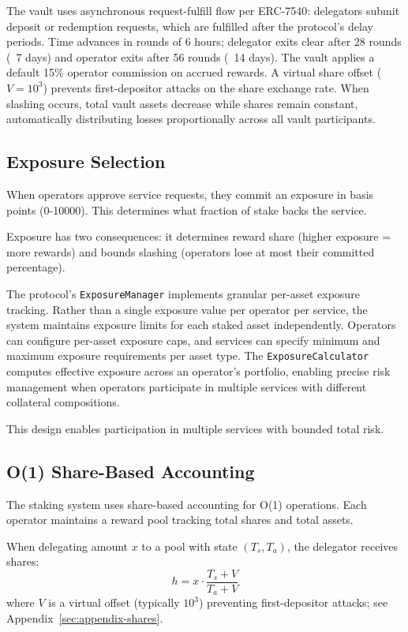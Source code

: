 \documentclass[11pt,a4paper]{article}
\begin{document}
The vault uses asynchronous request-fulfill flow per ERC-7540: delegators submit deposit or redemption requests, which are fulfilled after the protocol's delay periods. Time advances in rounds of 6 hours; delegator exits clear after 28 rounds (~7 days) and operator exits after 56 rounds (~14 days). The vault applies a default 15\% operator commission on accrued rewards. A virtual share offset ($V = 10^3$) prevents first-depositor attacks on the share exchange rate. When slashing occurs, total vault assets decrease while shares remain constant, automatically distributing losses proportionally across all vault participants.

\subsection{Exposure Selection}

When operators approve service requests, they commit an exposure in basis points (0-10000). This determines what fraction of stake backs the service.

Exposure has two consequences: it determines reward share (higher exposure = more rewards) and bounds slashing (operators lose at most their committed percentage).

The protocol's \texttt{ExposureManager} implements granular per-asset exposure tracking. Rather than a single exposure value per operator per service, the system maintains exposure limits for each staked asset independently. Operators can configure per-asset exposure caps, and services can specify minimum and maximum exposure requirements per asset type. The \texttt{ExposureCalculator} computes effective exposure across an operator's portfolio, enabling precise risk management when operators participate in multiple services with different collateral compositions.

This design enables participation in multiple services with bounded total risk.

\subsection{O(1) Share-Based Accounting}

The staking system uses share-based accounting for O(1) operations. Each operator maintains a reward pool tracking total shares and total assets.

When delegating amount $x$ to a pool with state $(T_s, T_a)$, the delegator receives shares:
\[
h = x \cdot \frac{T_s + V}{T_a + V}
\]
where $V$ is a virtual offset (typically $10^3$) preventing first-depositor attacks; see Appendix~\ref{sec:appendix-shares}.
\end{document}
